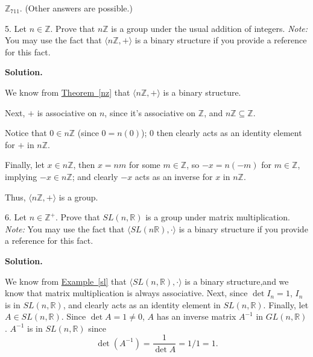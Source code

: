 \documentclass[10pt,]{book}
\theoremstyle{plain}
\theoremstyle{definition}
\theoremstyle{definition}
\theoremstyle{definition}
\theoremstyle{definition}
\numberwithin{equation}{section}
\def\Z{\mathbb{Z}}
\def\R{\mathbb{R}}
\begin{document}
\begin{exerciselist}
      \(\Z_{711}\). (Other answers are possible.)
\item[5.]\hypertarget{exercise-16}{}
        Let \(n\in \Z\). Prove that \(n\Z\) is a group under the usual addition of integers. \emph{Note:} You may use the fact that \(\langle n\Z,+\rangle\) is a binary structure if you provide a reference for this fact.
\par\smallskip
\par\smallskip
\noindent\textbf{Solution.}\hypertarget{solution-16}{}\quad

      We know from \hyperref[nz]{Theorem~\ref{nz}} that \(\langle n\Z,+\rangle\) is a binary structure.%
\par
 Next, \(+\) is
            associative on \(n\), since it's associative on
            \(\Z\), and \(n\Z \subseteq \Z\).
\par
            Notice that
            \(0\in n\Z\) (since \(0=n(0)\)); 0 then clearly acts as
            an identity element for \(+\) in \(n\Z\).
\par
Finally, let \(x\in n\Z\), then \(x=nm\) for some \(m\in \Z\), so
            \(-x=n(-m)\) for \(m\in \Z\), implying \(-x\in n\Z\);
            and clearly \(-x\) acts as an inverse for \(x\) in
            \(n\Z\).
\par

      Thus, \(\langle n\Z, +\rangle\) is a group.
\item[6.]\hypertarget{exercise-17}{}
        Let \(n\in \Z^+\). Prove that \(SL(n,\R)\) is a group under matrix multiplication.
        \emph{Note:} You may use the fact that \(\langle SL(n\R),\cdot\rangle\) is a binary structure if you provide a reference for this fact.
\par\smallskip
\par\smallskip
\noindent\textbf{Solution.}\hypertarget{solution-17}{}\quad

      We know from \hyperref[sl]{Example~\ref{sl}} that \(\langle SL(n,\R),\cdot\rangle\) is a binary structure,and we know that matrix multiplication is always associative. Next, since \(\det I_n=1\), \(I_n\) is in \(SL(n,\R)\), and clearly acts as an identity element in \(SL(n,\R)\). Finally, let \(A\in SL(n,\R)\).  Since \(\det A=1\neq 0\), \(A\) has an inverse matrix \(A^{-1}\) in \(GL(n, \R)\).  \(A^{-1}\) is in \(SL(n,\R)\) since
\begin{equation*}

              \det(A^{-1})=\frac{1}{\det A}=1/1=1.
            

\end{equation*}
\end{exerciselist}
\end{document}

